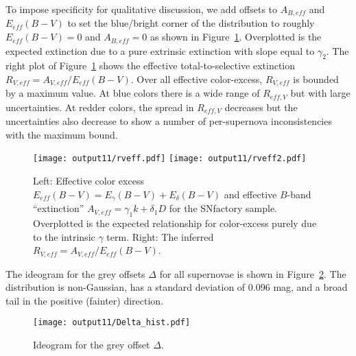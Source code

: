 \documentclass{aastex}   	%
\begin{document}
To impose specificity for qualitative discussion, we add offsets to $A_{B, eff}$ and $E_{eff}(B-V)$ to  set the
blue/bright corner of the distribution to roughly $E_{eff}(B-V)=0$ and $A_{B, eff}=0$  as shown in Figure~\ref{rveff:fig}.
Overplotted is the expected extinction due to a pure extrinsic extinction with slope equal to $\gamma_2$.
The right plot of Figure~\ref{rveff:fig} shows 
the effective total-to-selective extinction $R_{V,eff} = A_{V, eff}/E_{eff}(B-V)$.
Over all effective color-excess, $R_{V,eff}$ is bounded by a maximum value.  At blue colors there is a wide range of $R_{eff,V}$
but with large uncertainties.  At redder colors, the spread in $R_{eff,V}$ decreases but the uncertainties also decrease to 
show a number of per-supernova
inconsistencies with the maximum bound.

\begin{figure}[htbp] %
   \centering
   \texttt{[image: output11/rveff.pdf]}
   \texttt{[image: output11/rveff2.pdf]}
   \caption{Left: Effective color excess $E_{eff}(B-V) = E_\gamma(B-V) + E_\delta(B-V)$ and effective $B$-band ``extinction''
$A_{V, eff} = \gamma_1 k + \delta_1D$ for the SNfactory sample.  Overplotted is the expected relationship for color-excess
purely due to the intrinsic $\gamma$ term. 
Right:  The inferred $R_{V,eff} = A_{V, eff}/E_{eff}(B-V)$.
   \label{rveff:fig}}
\end{figure}


The ideogram for the grey offsets $\Delta$ for all supernovae is shown in Figure~\ref{hist:fig}.  The distribution is non-Gaussian, 
has a standard deviation of $0.096$ mag, and a broad tail in the positive (fainter) direction.
\begin{figure}[htbp] %
   \centering
   \texttt{[image: output11/Delta\_hist.pdf]} 
   \caption{Ideogram for the grey offset $\Delta$.
   \label{hist:fig}}
\end{figure}
\end{document}
